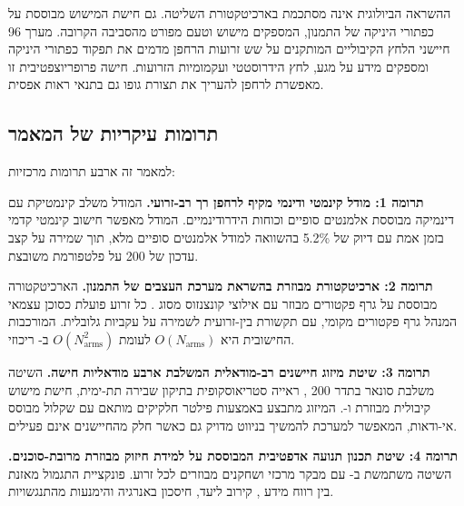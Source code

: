 ההשראה הביולוגית אינה מסתכמת בארכיטקטורת השליטה. גם חישת המישוש מבוססת על כפתורי היניקה של התמנון, המספקים מישוש וטעם מפורט מהסביבה הקרובה. מערך 96 חיישני הלחץ הקיבוליים המותקנים על שש זרועות הרחפן מדמים את תפקוד כפתורי היניקה ומספקים מידע על מגע, לחץ הידרוסטטי ועקמומיות הזרועות. חישה פרופריוצפטיבית זו מאפשרת לרחפן להעריך את תצורת גופו גם בתנאי ראות אפסית.

\subsection{תרומות עיקריות של המאמר}
\label{sec:intro_contributions}

למאמר זה ארבע תרומות מרכזיות:

\textbf{תרומה 1: מודל קינמטי ודינמי מקיף לרחפן רך רב-זרועי.} המודל משלב קינמטיקת  עם דינמיקה מבוססת אלמנטים סופיים וכוחות הידרודינמיים. המודל מאפשר חישוב קינמטי קדמי בזמן אמת עם דיוק של 5.2\% בהשוואה למודל אלמנטים סופיים מלא, תוך שמירה על קצב עדכון של 200  על פלטפורמת  משובצת.

\textbf{תרומה 2: ארכיטקטורת  מבוזרת בהשראת מערכת העצבים של התמנון.} הארכיטקטורה מבוססת על גרף פקטורים מבוזר עם אילוצי קונצנזוס מסוג . כל זרוע פועלת כסוכן  עצמאי המנהל גרף פקטורים מקומי, עם תקשורת בין-זרועית לשמירה על עקביות גלובלית. המורכבות החישובית היא $O(N_{\text{arms}})$ לעומת $O(N_{\text{arms}}^2)$ ב- ריכוזי.

\textbf{תרומה 3: שיטת מיזוג חיישנים רב-מודאלית המשלבת ארבע מודאליות חישה.} השיטה משלבת סונאר בתדר 200 , ראייה סטריאוסקופית בתיקון שבירה תת-ימית, חישת מישוש קיבולית מבוזרת ו-. המיזוג מתבצע באמצעות פילטר חלקיקים מותאם עם שקלול מבוסס אי-ודאות, המאפשר למערכת להמשיך בניווט מדויק גם כאשר חלק מהחיישנים אינם פעילים.

\textbf{תרומה 4: שיטת תכנון תנועה אדפטיבית המבוססת על למידת חיזוק מבוזרת מרובת-סוכנים.} השיטה משתמשת ב- עם מבקר מרכזי ושחקנים מבוזרים לכל זרוע. פונקציית התגמול מאזנת בין רווח מידע , קירוב ליעד, חיסכון באנרגיה והימנעות מהתנגשויות.

\begin{table}[htbp]
\centering
\caption{השוואת גישות  ביומימטי ממקורות השראה ביולוגיים שונים.}
\label{tab:bio_slam_comparison}
\end{table}

